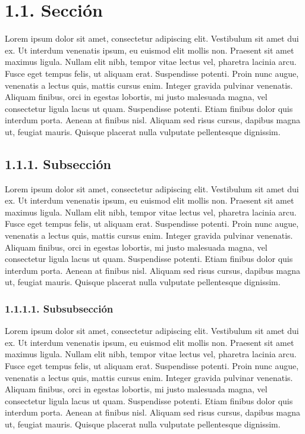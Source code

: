 \documentclass[a4paper,openright,12pt]{report}
\begin{document}
\section*{1.1. Sección}

Lorem ipsum dolor sit amet, consectetur adipiscing elit. Vestibulum sit amet dui ex. Ut interdum venenatis ipsum, eu euismod elit mollis non. Praesent sit amet maximus ligula. Nullam elit nibh, tempor vitae lectus vel, pharetra lacinia arcu. Fusce eget tempus felis, ut aliquam erat. Suspendisse potenti. Proin nunc augue, venenatis a lectus quis, mattis cursus enim. Integer gravida pulvinar venenatis. Aliquam finibus, orci in egestas lobortis, mi justo malesuada magna, vel consectetur ligula lacus ut quam. Suspendisse potenti. Etiam finibus dolor quis interdum porta. Aenean at finibus nisl. Aliquam sed risus cursus, dapibus magna ut, feugiat mauris. Quisque placerat nulla vulputate pellentesque dignissim. 

\subsection*{1.1.1. Subsección}

Lorem ipsum dolor sit amet, consectetur adipiscing elit. Vestibulum sit amet dui ex. Ut interdum venenatis ipsum, eu euismod elit mollis non. Praesent sit amet maximus ligula. Nullam elit nibh, tempor vitae lectus vel, pharetra lacinia arcu. Fusce eget tempus felis, ut aliquam erat. Suspendisse potenti. Proin nunc augue, venenatis a lectus quis, mattis cursus enim. Integer gravida pulvinar venenatis. Aliquam finibus, orci in egestas lobortis, mi justo malesuada magna, vel consectetur ligula lacus ut quam. Suspendisse potenti. Etiam finibus dolor quis interdum porta. Aenean at finibus nisl. Aliquam sed risus cursus, dapibus magna ut, feugiat mauris. Quisque placerat nulla vulputate pellentesque dignissim.

\subsubsection*{1.1.1.1. Subsubsección}

Lorem ipsum dolor sit amet, consectetur adipiscing elit. Vestibulum sit amet dui ex. Ut interdum venenatis ipsum, eu euismod elit mollis non. Praesent sit amet maximus ligula. Nullam elit nibh, tempor vitae lectus vel, pharetra lacinia arcu. Fusce eget tempus felis, ut aliquam erat. Suspendisse potenti. Proin nunc augue, venenatis a lectus quis, mattis cursus enim. Integer gravida pulvinar venenatis. Aliquam finibus, orci in egestas lobortis, mi justo malesuada magna, vel consectetur ligula lacus ut quam. Suspendisse potenti. Etiam finibus dolor quis interdum porta. Aenean at finibus nisl. Aliquam sed risus cursus, dapibus magna ut, feugiat mauris. Quisque placerat nulla vulputate pellentesque dignissim.
\end{document}
